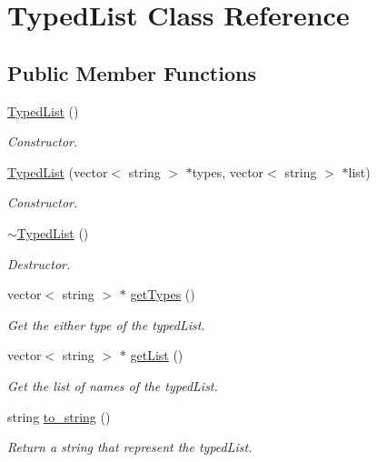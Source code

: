 \hypertarget{classTypedList}{\section{Typed\+List Class Reference}
\label{classTypedList}
}
\subsection*{Public Member Functions}
\begin{DoxyCompactItemize}
\item 
\hypertarget{classTypedList_a78fc3942f04cb58e7c2987513e8387bf}{\hyperlink{classTypedList_a78fc3942f04cb58e7c2987513e8387bf}{Typed\+List} ()}\label{classTypedList_a78fc3942f04cb58e7c2987513e8387bf}

\begin{DoxyCompactList}\small\item\em Constructor. \end{DoxyCompactList}\item 
\hyperlink{classTypedList_aadc8f3a4c935d27b8a79a9fd6e131c46}{Typed\+List} (vector$<$ string $>$ $\ast$types, vector$<$ string $>$ $\ast$list)
\begin{DoxyCompactList}\small\item\em Constructor. \end{DoxyCompactList}\item 
\hypertarget{classTypedList_a73a2a3083e16ac7db66b696f5ccafcdf}{\hyperlink{classTypedList_a73a2a3083e16ac7db66b696f5ccafcdf}{$\sim$\+Typed\+List} ()}\label{classTypedList_a73a2a3083e16ac7db66b696f5ccafcdf}

\begin{DoxyCompactList}\small\item\em Destructor. \end{DoxyCompactList}\item 
vector$<$ string $>$ $\ast$ \hyperlink{classTypedList_a8cae2cad5ac57f1bb8d899933dca8dbe}{get\+Types} ()
\begin{DoxyCompactList}\small\item\em Get the either type of the typed\+List. \end{DoxyCompactList}\item 
vector$<$ string $>$ $\ast$ \hyperlink{classTypedList_a0fbf0e28497f94fe82ede0d6524956ef}{get\+List} ()
\begin{DoxyCompactList}\small\item\em Get the list of names of the typed\+List. \end{DoxyCompactList}\item 
string \hyperlink{classTypedList_ad46ec33364e0dff99a7759c9d5e06d62}{to\+\_\+string} ()
\begin{DoxyCompactList}\small\item\em Return a string that represent the typed\+List. \end{DoxyCompactList}\end{DoxyCompactItemize}


